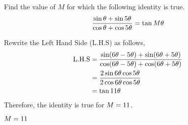 

\question[3] Find the value of $M$ for which the following identity is true.
\begin{align}
  \dfrac{\sin\theta+\sin 5\theta}{\cos\theta+\cos 5\theta} 
    = \tan M\theta \nonumber
\end{align}

\watchout

\begin{solution}[\halfpage]
  Rewrite the Left Hand Side (L.H.S) as follows,
  \begin{align}
    \text{L.H.S} &= \dfrac{\sin(6\theta-5\theta)+\sin(6\theta+5\theta)}
                      {\cos(6\theta-5\theta)+\cos(6\theta+5\theta)} \\
                 &= \dfrac{2\sin 6\theta\cos 5\theta}
                      {2\cos 6\theta\cos 5\theta} \\
                 &= \tan 11\theta
  \end{align}
  Therefore, the identity is true for $M=11$.
\end{solution}

\ifprintanswers\begin{codex}$M=11$\end{codex}\fi
